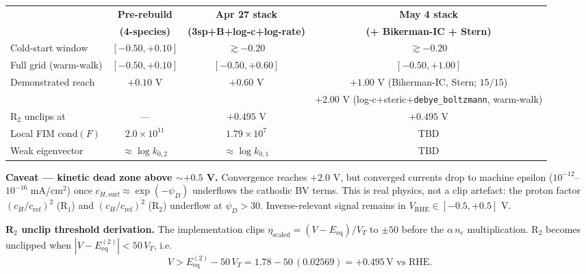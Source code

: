 \documentclass[11pt]{article}
\newcommand{\VT}{V_{T}}
\newcommand{\Eeq}{E_{\mathrm{eq}}}
\newcommand{\VRHE}{V_{\mathrm{RHE}}}
\begin{document}
\begin{tcolorbox}[cardstyle={Headline: voltage-window expansion}]
\begin{center}
\begin{tabular}{lccc}
\hline
& \textbf{Pre-rebuild} & \textbf{Apr 27 stack} & \textbf{May 4 stack} \\
& \textbf{(4-species)} & \textbf{(3sp+B+log-c+log-rate)} & \textbf{(+ Bikerman-IC + Stern)} \\
\hline
Cold-start window & \([-0.50,+0.10]\) & \(\gtrsim -0.20\) & \(\gtrsim -0.20\) \\
Full grid (warm-walk) & \([-0.50,+0.10]\) & \([-0.50,+0.60]\) & \([-0.50,+1.00]\) \\
Demonstrated reach
   & \(+0.10\) V
   & \(+0.60\) V
   & \(+1.00\) V (Bikerman-IC, Stern; \(15/15\)) \\
   &
   &
   & \(+2.00\) V (log-c+steric+\texttt{debye\_boltzmann}, warm-walk) \\
\(\mathrm{R_2}\) unclips at & --- & \(+0.495\) V & \(+0.495\) V \\
Local FIM \(\mathrm{cond}(F)\) & \(2.0\times 10^{11}\) & \(1.79\times 10^{7}\) & TBD \\
Weak eigenvector
   & \(\approx \log k_{0,2}\)
   & \(\approx \log k_{0,1}\)
   & TBD\\
\hline
\end{tabular}
\end{center}

\textbf{Caveat — kinetic dead zone above \(\sim +0.5\) V.}
Convergence reaches \(+2.0\) V, but converged currents drop to
machine epsilon (\(10^{-12}\)--\(10^{-16}\) mA/cm\(^{2}\)) once
\(c_{H,\mathrm{surf}} \approx \exp(-\psi_D)\) underflows the cathodic
BV terms. This is real physics, not a clip artefact: the proton
factor \((c_H/c_{\mathrm{ref}})^{2}\) (R\(_1\)) and \((c_H/c_{\mathrm{ref}})^{2}\)
(R\(_2\)) underflow at \(\psi_D > 30\). Inverse-relevant signal
remains in \(\VRHE\in[-0.5, +0.5]\) V.

\textbf{R$_2$ unclip threshold derivation.} The implementation clips
\(\eta_{\mathrm{scaled}} = (V-\Eeq)/\VT\) to \(\pm 50\) before the
\(\alpha\,n_e\) multiplication. R$_2$ becomes unclipped when
\(|V - \Eeq^{(2)}| < 50\,\VT\), i.e.\
\[
  V > \Eeq^{(2)} - 50\,\VT
   = 1.78 - 50\,(0.02569)
   = +0.495\,\text{V vs RHE}.
\]
\end{tcolorbox}
\end{document}
